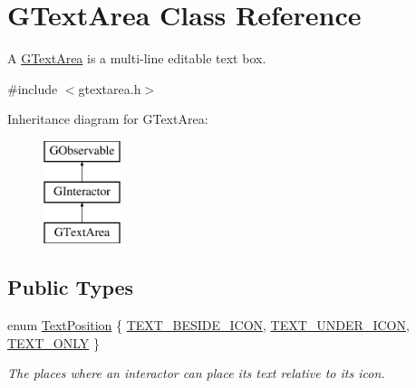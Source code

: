 \hypertarget{classsgl_1_1GTextArea}{}\section{G\+Text\+Area Class Reference}
\label{classsgl_1_1GTextArea}


A \mbox{\hyperlink{classsgl_1_1GTextArea}{G\+Text\+Area}} is a multi-\/line editable text box.  




{\ttfamily \#include $<$gtextarea.\+h$>$}

Inheritance diagram for G\+Text\+Area\+:\begin{figure}[H]
\begin{center}
\leavevmode
\includegraphics[height=3.000000cm]{classsgl_1_1GTextArea}
\end{center}
\end{figure}
\subsection*{Public Types}
\begin{DoxyCompactItemize}
\item 
enum \mbox{\hyperlink{classsgl_1_1GInteractor_a8e0d441725a81d2bbdebbea09078260e}{Text\+Position}} \{ \mbox{\hyperlink{classsgl_1_1GInteractor_a8e0d441725a81d2bbdebbea09078260ea4cd6f2e7d5a08d6f4dc052df2358f774}{T\+E\+X\+T\+\_\+\+B\+E\+S\+I\+D\+E\+\_\+\+I\+C\+ON}}, 
\mbox{\hyperlink{classsgl_1_1GInteractor_a8e0d441725a81d2bbdebbea09078260eaa88490f63d8de68d44c83bdb2ecde3b3}{T\+E\+X\+T\+\_\+\+U\+N\+D\+E\+R\+\_\+\+I\+C\+ON}}, 
\mbox{\hyperlink{classsgl_1_1GInteractor_a8e0d441725a81d2bbdebbea09078260ea39a6f388a30ac4fefb6eb13e846bc9f2}{T\+E\+X\+T\+\_\+\+O\+N\+LY}}
 \}
\begin{DoxyCompactList}\small\item\em The places where an interactor can place its text relative to its icon. \end{DoxyCompactList}\end{DoxyCompactItemize}
